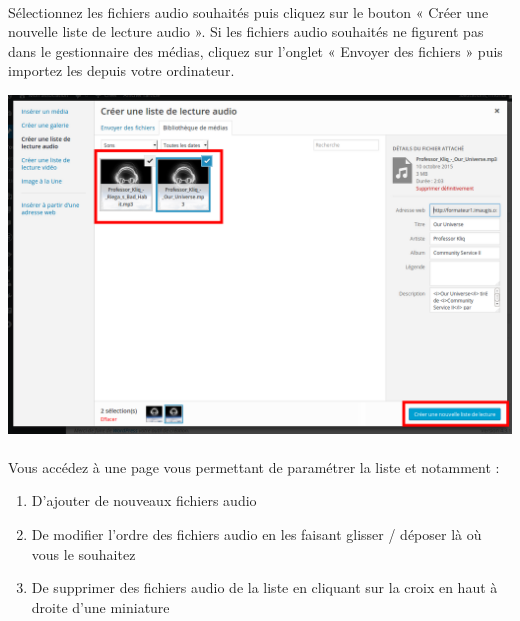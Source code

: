 \documentclass[10pt,a4paper]{article}
\begin{document}
\paragraph{}Sélectionnez les fichiers audio souhaités puis cliquez sur le bouton « Créer une nouvelle liste de lecture audio ». Si les fichiers audio souhaités ne figurent pas dans le gestionnaire des médias, cliquez sur l'onglet « Envoyer des fichiers » puis importez les depuis votre ordinateur.
\begin{center}
\includegraphics[scale=0.25]{img/0123.png}
\end{center}
\newpage
\paragraph{}Vous accédez à une page vous permettant de paramétrer la liste et notamment :
\begin{enumerate}
\item D'ajouter de nouveaux fichiers audio
\item De modifier l'ordre des fichiers audio en les faisant glisser / déposer là où vous le souhaitez
\item De supprimer des fichiers audio de la liste en cliquant sur la croix en haut à droite d'une miniature
\end{enumerate}
\end{document}
